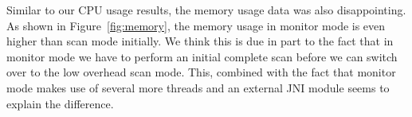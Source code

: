 Similar to our CPU usage results, the memory usage data was also disappointing. As shown in Figure~\ref{fig:memory}, the memory usage in monitor mode is even higher than scan mode initially. We think this is due in part to the fact that in monitor mode we have to perform an initial complete scan before we can switch over to the low overhead scan mode.  This, combined with the fact that monitor mode makes use of several more threads and an external JNI module seems to explain the difference.

\begin{figure}%
\centering
{}
\hspace{0.20in}

\end{figure}
